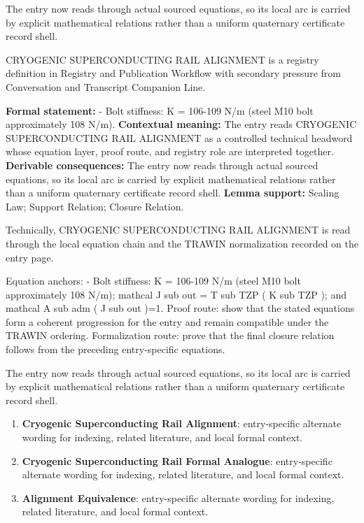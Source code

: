 The entry now reads through actual sourced equations, so its local arc is carried by explicit mathematical relations rather than a uniform quaternary certificate record shell.
\clearpage


\begingroup\small
{}
CRYOGENIC SUPERCONDUCTING RAIL ALIGNMENT is a registry definition in Registry and Publication Workflow with secondary pressure from Conversation and Transcript Companion Line.

\begingroup\footnotesize\setlength{\emergencystretch}{3em}\sloppy
\textbf{Formal statement:} - Bolt stiffness: K = 106-109 N/m (steel M10 bolt approximately 108 N/m). \textbf{Contextual meaning:} The entry reads CRYOGENIC SUPERCONDUCTING RAIL ALIGNMENT as a controlled technical headword whose equation layer, proof route, and registry role are interpreted together. \textbf{Derivable consequences:} The entry now reads through actual sourced equations, so its local arc is carried by explicit mathematical relations rather than a uniform quaternary certificate record shell. \textbf{Lemma support:} Scaling Law; Support Relation; Closure Relation.\par
\endgroup

Technically, CRYOGENIC SUPERCONDUCTING RAIL ALIGNMENT is read through the local equation chain and the TRAWIN normalization recorded on the entry page.

Equation anchors: - Bolt stiffness: K = 106-109 N/m (steel M10 bolt approximately 108 N/m); mathcal J sub out = T sub TZP ( K sub TZP ); and mathcal A sub adm ( J sub out )=1. Proof route: show that the stated equations form a coherent progression for the entry and remain compatible under the TRAWIN ordering. Formalization route: prove that the final closure relation follows from the preceding entry-specific equations.

The entry now reads through actual sourced equations, so its local arc is carried by explicit mathematical relations rather than a uniform quaternary certificate record shell.
\endgroup

\begin{enumerate}[leftmargin=1.6em,itemsep=6pt,topsep=4pt]
\item \textbf{Cryogenic Superconducting Rail Alignment}: entry-specific alternate wording for indexing, related literature, and local formal context.
\item \textbf{Cryogenic Superconducting Rail Formal Analogue}: entry-specific alternate wording for indexing, related literature, and local formal context.
\item \textbf{Alignment Equivalence}: entry-specific alternate wording for indexing, related literature, and local formal context.
\end{enumerate}

